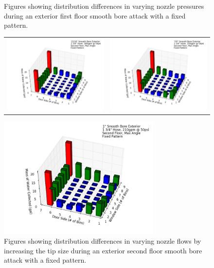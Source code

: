\documentclass{article}
\begin{document}
\begin{figure}[ht]
\begin{tabular*}{\textwidth}{lr}
\end{tabular*}
\caption{Figures showing distribution differences in varying nozzle pressures during an exterior first floor smooth bore attack with a fixed pattern.}
\label{fig:Exterior_First_Floor_Varying_Nozzle_Pressure_SB_Fixed_Pattern}
\end{figure}

\clearpage

\begin{figure}[ht]
\begin{tabular*}{\textwidth}{lr}
\includegraphics[width=3.2in]{../ADD_Analysis/Figures/15-12-07_111118_Datafile_15_16in_Smooth_Bore_Exterior.png} &
\includegraphics[width=3.2in]{../ADD_Analysis/Figures/15-12-07_143141_Datafile_7_8in_Smooth_Bore_Exterior.png} \\
\end{tabular*}
\centering
\includegraphics[width=3.2in]{../ADD_Analysis/Figures/15-12-07_143828_Datafile_1in_Smooth_Bore_Exterior.png}
\caption{Figures showing distribution differences in varying nozzle flows by increasing the tip size during an exterior second floor smooth bore attack with a fixed pattern.}
\label{fig:Exterior_Second_Floor_Varying_Nozzle_Pressure_SB_Fixed_Pattern}
\end{figure}
\end{document}

